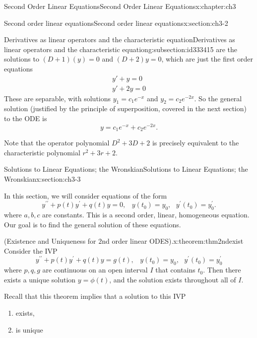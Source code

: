 \documentclass[oneside,10pt,]{book}
\numberwithin{equation}{section}
\numberwithin{equation}{section}
\begin{document}
\begin{chapterptx}{Second Order Linear Equations}{}{Second Order Linear Equations}{}{}{x:chapter:ch3}
\begin{sectionptx}{Second order linear equations}{}{Second order linear equations}{}{}{x:section:ch3-2}
\begin{subsectionptx}{Derivatives as linear operators and the characteristic equation}{}{Derivatives as linear operators and the characteristic equation}{}{}{g:subsection:id333415}
are the solutions to \((D + 1)(y) = 0\) and \((D + 2)y = 0\), which are just the first order equations%
\begin{gather*}
y' + y = 0\\
y' + 2y = 0
\end{gather*}
These are separable, with solutions \(y_1 = c_1 e^{-x}\) and \(y_2 = c_2 e^{-2x}\). So the general solution (justified by the principle of superposition, covered in the next section) to the ODE is%
\begin{equation*}
y = c_1 e^{-x} + c_2 e^{-2x}.
\end{equation*}
%
\par
Note that the operator polynomial \(D^2 + 3D + 2\) is precisely equivalent to the characteristic polynomial \(r^2 + 3r + 2\).%
\end{subsectionptx}
\end{sectionptx}
%
%
\typeout{************************************************}
\typeout{************************************************}
%
\begin{sectionptx}{Solutions to Linear Equations; the Wronskian}{}{Solutions to Linear Equations; the Wronskian}{}{}{x:section:ch3-3}
\begin{introduction}{}%
In this section, we will consider equations of the form%
\begin{equation*}
y^{\prime\prime}+p(t)y^{\prime}+q(t)y=0,\,\,\,\,\,y(t_{0})=y_{0},\,\,\,\,y^{\prime}(t_{0})=y_{0}^{\prime}.
\end{equation*}
where \(a,b,c\) are constants. This is a second order, linear, homogeneous equation. Our goal is to find the general solution of these equations.%
\begin{theorem}{(Existence and Uniqueness for \(2\)nd order linear ODES).}{}{x:theorem:thm2ndexist}%
Consider the IVP%
\begin{equation*}
y^{\prime\prime}+p(t)y^{\prime}+q(t)y=g(t),\,\,\,\,\,y(t_{0})=y_{0},\,\,\,\,y^{\prime}(t_{0})=y_{0}^{\prime}
\end{equation*}
where \(p,q,g\) are continuous on an open interval \(I\) that contains \(t_{0}\). Then there exists a unique solution \(y=\phi(t)\), and the solution exists throughout all of \(I\).%
\end{theorem}
Recall that this theorem implies that a solution to this IVP%
\begin{enumerate}
\item{}exists,%
\item{}is unique%

\end{enumerate}
\end{introduction}
\end{sectionptx}
\end{chapterptx}
\end{document}
